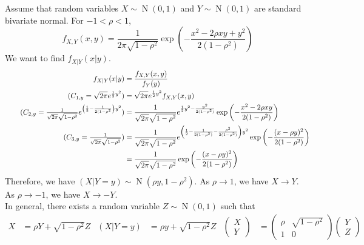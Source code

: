 \documentclass{huhtakm-template-book}
\DeclareMathOperator{\N}{N}
\begin{document}
    \newpage
    \begin{eg}
        Assume that random variables $X\sim\N(0,1)$ and $Y\sim\N(0,1)$ are standard bivariate normal. For $-1<\rho<1$,
        \begin{equation*}
            f_{X,Y}(x,y)=\frac{1}{2\pi\sqrt{1-\rho^{2}}}\exp\left(-\frac{x^{2}-2\rho xy+y^{2}}{2(1-\rho^{2})}\right)
        \end{equation*}
        We want to find $f_{X|Y}(x|y)$.
        \begin{align*}
            f_{X|Y}(x|y)&=\frac{f_{X,Y}(x,y)}{f_{Y}(y)}\\
            \tag{$C_{1,y}=\sqrt{2\pi}e^{\frac{1}{2}y^{2}}$}
            &=\sqrt{2\pi}e^{\frac{1}{2}y^{2}}f_{X,Y}(x,y)\\
            \tag{$C_{2,y}=\frac{1}{\sqrt{2\pi}\sqrt{1-\rho^{2}}}e^{\left(\frac{1}{2}-\frac{1}{2(1-\rho^{2}}\right)y^{2}}$}
            &=\frac{1}{\sqrt{2\pi}\sqrt{1-\rho^{2}}}e^{\frac{1}{2}y^{2}-\frac{y^{2}}{2(1-\rho^{2})}}\exp\left(-\frac{x^{2}-2\rho xy}{2(1-\rho^{2})}\right)\\
            \tag{$C_{3,y}=\frac{1}{\sqrt{2\pi}\sqrt{1-\rho^{2}}}$}
            &=\frac{1}{\sqrt{2\pi}{\sqrt{1-\rho^{2}}}}e^{\left(\frac{1}{2}-\frac{1}{2(1-\rho^{2})}-\frac{\rho^{2}}{2(1-\rho^{2})}\right)y^{2}}\exp\left(-\frac{(x-\rho y)^{2}}{2(1-\rho^{2})}\right)\\
            &=\frac{1}{\sqrt{2\pi}\sqrt{1-\rho^{2}}}\exp\left(-\frac{(x-\rho y)^{2}}{2(1-\rho^{2})}\right)
        \end{align*}
        Therefore, we have $(X|Y=y)\sim\N(\rho y,1-\rho^{2})$. As $\rho\to 1$, we have $X\to Y$. As $\rho\to -1$, we have $X\to -Y$.\\
        In general, there exists a random variable $Z\sim\N(0,1)$ such that
        \begin{align*}
            X&=\rho Y+\sqrt{1-\rho^{2}}Z & (X|Y=y)&=\rho y+\sqrt{1-\rho^{2}}Z & \begin{pmatrix}
                X\\
                Y
            \end{pmatrix}&=\begin{pmatrix}
                \rho & \sqrt{1-\rho^{2}}\\
                1 & 0
            \end{pmatrix}\begin{pmatrix}
                Y\\
                Z
            \end{pmatrix}

\end{align*}
\end{eg}
\end{document}
